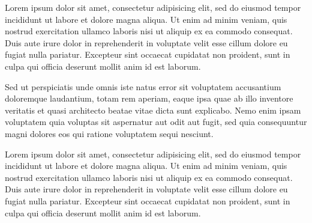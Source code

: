 %

Lorem ipsum dolor sit amet, consectetur adipisicing elit, sed do eiusmod 
tempor incididunt ut labore et dolore magna aliqua. Ut enim ad minim veniam, 
quis nostrud exercitation ullamco laboris nisi ut aliquip ex ea commodo 
consequat. Duis aute irure dolor in reprehenderit in voluptate velit esse 
cillum dolore eu fugiat nulla pariatur. Excepteur sint occaecat cupidatat 
non proident, sunt in culpa qui officia deserunt mollit anim id est laborum.

Sed ut perspiciatis unde omnis iste natus error sit voluptatem accusantium 
doloremque laudantium, totam rem aperiam, eaque ipsa quae ab illo inventore 
veritatis et quasi architecto beatae vitae dicta sunt explicabo. Nemo enim 
ipsam voluptatem quia voluptas sit aspernatur aut odit aut fugit, sed quia 
consequuntur magni dolores eos qui ratione voluptatem sequi nesciunt.

Lorem ipsum dolor sit amet, consectetur adipisicing elit, sed do eiusmod 
tempor incididunt ut labore et dolore magna aliqua. Ut enim ad minim veniam, 
quis nostrud exercitation ullamco laboris nisi ut aliquip ex ea commodo 
consequat. Duis aute irure dolor in reprehenderit in voluptate velit esse 
cillum dolore eu fugiat nulla pariatur. Excepteur sint occaecat cupidatat 
non proident, sunt in culpa qui officia deserunt mollit anim id est laborum.
